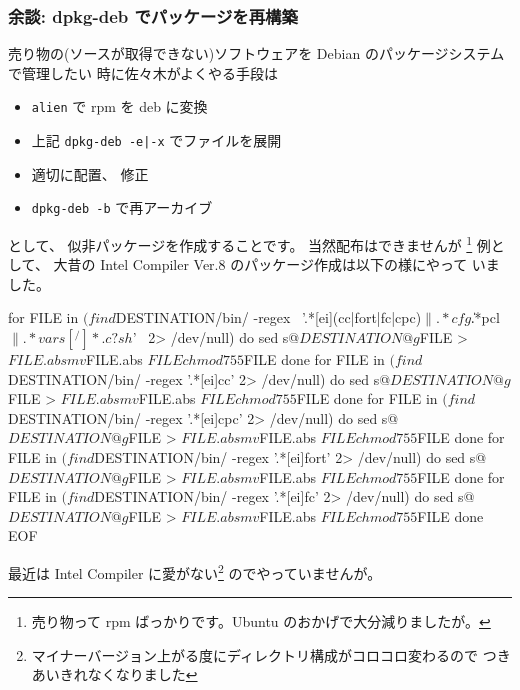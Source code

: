 \documentclass[mingoth,a4paper]{jsarticle}
\begin{document}
\subsubsection{余談: dpkg-deb でパッケージを再構築}
\label{subsubseclab:余談}

売り物の(ソースが取得できない)ソフトウェアを
Debian のパッケージシステムで管理したい
時に佐々木がよくやる手段は
\begin{itemize}
      \item {\tt alien} で rpm を deb に変換
      \item 上記 {\tt dpkg-deb -e|-x} でファイルを展開
      \item 適切に配置、 修正
      \item {\tt dpkg-deb -b} で再アーカイブ
\end{itemize}
として、 似非パッケージを作成することです。
当然配布はできませんが%
\footnote{売り物って rpm ばっかりです。Ubuntu のおかげで大分減りましたが。}
例として、 大昔の Intel Compiler Ver.8 のパッケージ作成は以下の様にやって
いました。
\begin{commandline}
  for FILE in $(find $DESTINATION/bin/ -regex \
     '.*[ei](cc|fort|fc|cpc)$\|.*cfg$\|.*pcl$\|.*vars[^/]*.c?sh$' \
     2> /dev/null) do
      sed s@\@$DESTINATION@g $FILE > ${FILE}.abs
      mv ${FILE}.abs $FILE
      chmod 755 $FILE
  done
  for FILE in $(find $DESTINATION/bin/ -regex '.*[ei]cc' 2> /dev/null) do
      sed s@\@$DESTINATION@g $FILE > ${FILE}.abs
      mv ${FILE}.abs $FILE
      chmod 755 $FILE
  done
  for FILE in $(find $DESTINATION/bin/ -regex '.*[ei]cpc' 2> /dev/null) do
      sed s@\@$DESTINATION@g $FILE > ${FILE}.abs
      mv ${FILE}.abs $FILE
      chmod 755 $FILE
  done
  for FILE in $(find $DESTINATION/bin/ -regex '.*[ei]fort' 2> /dev/null) do
      sed s@\@$DESTINATION@g $FILE > ${FILE}.abs
      mv ${FILE}.abs $FILE
      chmod 755 $FILE
  done
  for FILE in $(find $DESTINATION/bin/ -regex '.*[ei]fc' 2> /dev/null) do
      sed s@\@$DESTINATION@g $FILE > ${FILE}.abs
      mv ${FILE}.abs $FILE
      chmod 755 $FILE
  done
 EOF
\end{commandline}
最近は Intel Compiler に愛がない\footnote{%
マイナーバージョン上がる度にディレクトリ構成がコロコロ変わるので
つきあいきれなくなりました}
のでやっていませんが。
\end{document}
